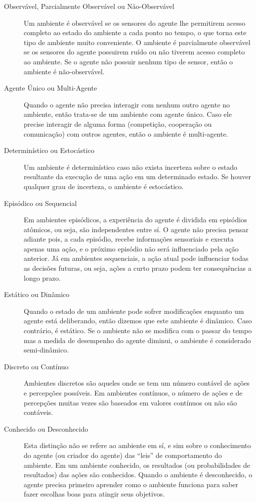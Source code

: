 \begin{description}
	\item[Observável, Parcialmente Observável ou Não-Observável]
		Um ambiente é observável se os sensores do agente lhe permitirem acesso
		completo ao estado do ambiente a cada ponto no tempo, o que torna este
		tipo de ambiente muito conveniente. O ambiente é parcialmente observável
		se os sensores do agente possuirem ruído ou não tiverem acesso completo
		ao ambiente. Se o agente não possuir nenhum tipo de sensor, então o
		ambiente é não-observável.

	\item[Agente Único ou Multi-Agente]
		Quando o agente não precisa interagir com nenhum outro agente no
		ambiente, então trata-se de um ambiente com agente único. Caso ele
		precise interagir de alguma forma (competição, cooperação ou
		comunicação) com outros agentes, então o ambiente é multi-agente.

	\item[Determinístico ou Estocástico]
		Um ambiente é determinístico caso não exista incerteza sobre o estado
		resultante da execução de uma ação em um determinado estado. Se houver
		qualquer grau de incerteza, o ambiente é estocástico.

	\item[Episódico ou Sequencial]
		Em ambientes episódicos, a experiência do agente é dividida em episódios
		atômicos, ou seja, são independentes entre sí. O agente não precisa
		pensar adiante pois, a cada episódio, recebe informações sensoriais e
		executa apenas uma ação, e o próximo episódio não será influenciado pela
		ação anterior. Já em ambientes sequenciais, a ação atual pode
		influenciar todas as decisões futuras, ou seja, ações a curto prazo
		podem ter consequências a longo prazo.

	\item[Estático ou Dinâmico]
		Quando o estado de um ambiente pode sofrer modificações enquanto um
		agente está deliberando, então dizemos que este ambiente é dinâmico.
		Caso contrário, é estático. Se o ambiente não se modifica com o passar
		do tempo mas a medida de desempenho do agente diminui, o ambiente é
		considerado semi-dinâmico.

	\item[Discreto ou Contínuo]
		Ambientes discretos são aqueles onde se tem um número contável de ações
		e percepções possíveis. Em ambientes contínuos, o número de ações e de
		percepções muitas vezes são baseados em valores contínuos ou não são
		contáveis.

	\item[Conhecido ou Desconhecido]
		Esta distinção não se refere ao ambiente em sí, e sim sobre o
		conhecimento do agente (ou criador do agente) das ``leis'' de
		comportamento do ambiente. Em um ambiente conhecido, os resultados (ou
		probabilidades de resultados) das ações são conhecidos. Quando o
		ambiente é desconhecido, o agente precisa primeiro aprender como o
		ambiente funciona para saber fazer escolhas boas para atingir seus
		objetivos.
\end{description}

